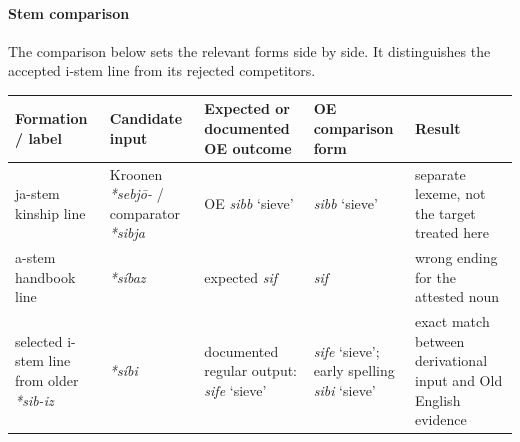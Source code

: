 \documentclass[
  british,
  a4paper,
]{article}
\newcounter{none} %
\begin{document}
\paragraph{Stem comparison}\label{stem-comparison-6}

The comparison below sets the relevant forms side by side. It
distinguishes the accepted i-stem line from its rejected competitors.

{\def\LTcaptype{none} %
\begin{longtable}[]{@{}
  >{\raggedright\arraybackslash}p{}
  >{\raggedright\arraybackslash}p{}
  >{\raggedright\arraybackslash}p{}
  >{\raggedright\arraybackslash}p{}
  >{\raggedright\arraybackslash}p{}@{}}
\toprule\noalign{}
\begin{minipage}[b]{\linewidth}\raggedright
Formation / label
\end{minipage} & \begin{minipage}[b]{\linewidth}\raggedright
Candidate input
\end{minipage} & \begin{minipage}[b]{\linewidth}\raggedright
Expected or documented OE outcome
\end{minipage} & \begin{minipage}[b]{\linewidth}\raggedright
OE comparison form
\end{minipage} & \begin{minipage}[b]{\linewidth}\raggedright
Result
\end{minipage} \\
\midrule\noalign{}
\endhead
\bottomrule\noalign{}
\endlastfoot
ja-stem kinship line & Kroonen \emph{*sebjō-} / comparator
{\emph{*sibja}} & OE {\emph{sibb}} `sieve' & {\emph{sibb}} `sieve' &
separate lexeme, not the target treated here \\
a-stem handbook line & {\emph{*síbaz}} & expected {\emph{sif}} &
{\emph{sif}} & wrong ending for the attested noun \\
selected i-stem line from older \emph{*sib-iz} & {\emph{*síbi}} &
documented regular output: {\emph{sife}} `sieve' & {\emph{sife}}
`sieve'; early spelling {\emph{sibi}} `sieve' & exact match between
derivational input and Old English evidence \\
\end{longtable}
}
\end{document}
